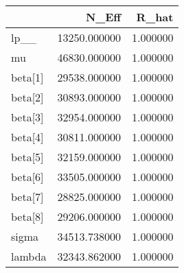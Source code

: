 \begin{tabular}{lrr}
\toprule
 & N_Eff & R_hat \\
\midrule
lp__ & 13250.000000 & 1.000000 \\
mu & 46830.000000 & 1.000000 \\
beta[1] & 29538.000000 & 1.000000 \\
beta[2] & 30893.000000 & 1.000000 \\
beta[3] & 32954.000000 & 1.000000 \\
beta[4] & 30811.000000 & 1.000000 \\
beta[5] & 32159.000000 & 1.000000 \\
beta[6] & 33505.000000 & 1.000000 \\
beta[7] & 28825.000000 & 1.000000 \\
beta[8] & 29206.000000 & 1.000000 \\
sigma & 34513.738000 & 1.000000 \\
lambda & 32343.862000 & 1.000000 \\
\bottomrule
\end{tabular}

